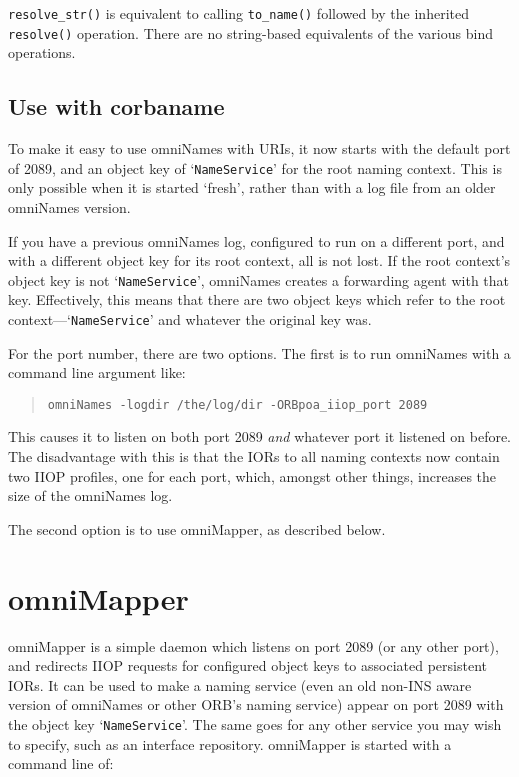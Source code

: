 \documentclass[11pt,twoside,a4paper]{book}
\newcommand{\op}[1]{\texttt{#1()}}
\newcommand{\cmdline}[1]{\texttt{#1}}
\newcommand{\corbauri}{\begingroup \urlstyle{tt}\Url}
\begin{document}
\op{resolve\_str} is equivalent to calling \op{to\_name} followed by
the inherited \op{resolve} operation. There are no string-based
equivalents of the various bind operations.


\subsection{Use with corbaname}

To make it easy to use omniNames with \corbauri{corbaname} URIs, it
now starts with the default port of 2089, and an object key of
`\texttt{NameService}' for the root naming context. This is only
possible when it is started `fresh', rather than with a log file from
an older omniNames version.

If you have a previous omniNames log, configured to run on a different
port, and with a different object key for its root context, all is not
lost. If the root context's object key is not `\texttt{NameService}',
omniNames creates a forwarding agent with that key. Effectively, this
means that there are two object keys which refer to the root
context---`\texttt{NameService}' and whatever the original key was.

For the port number, there are two options. The first is to run
omniNames with a command line argument like:

\begin{quote}
\cmdline{omniNames -logdir /the/log/dir -ORBpoa\_iiop\_port 2089}
\end{quote}

\noindent This causes it to listen on both port 2089 \emph{and}
whatever port it listened on before. The disadvantage with this is
that the IORs to all naming contexts now contain two IIOP profiles,
one for each port, which, amongst other things, increases the size of
the omniNames log.

The second option is to use omniMapper, as described below.


\section{omniMapper}

omniMapper is a simple daemon which listens on port 2089 (or any other
port), and redirects IIOP requests for configured object keys to
associated persistent IORs. It can be used to make a naming service
(even an old non-INS aware version of omniNames or other ORB's naming
service) appear on port 2089 with the object key
`\texttt{NameService}'. The same goes for any other service you may
wish to specify, such as an interface repository. omniMapper is
started with a command line of:
\end{document}
